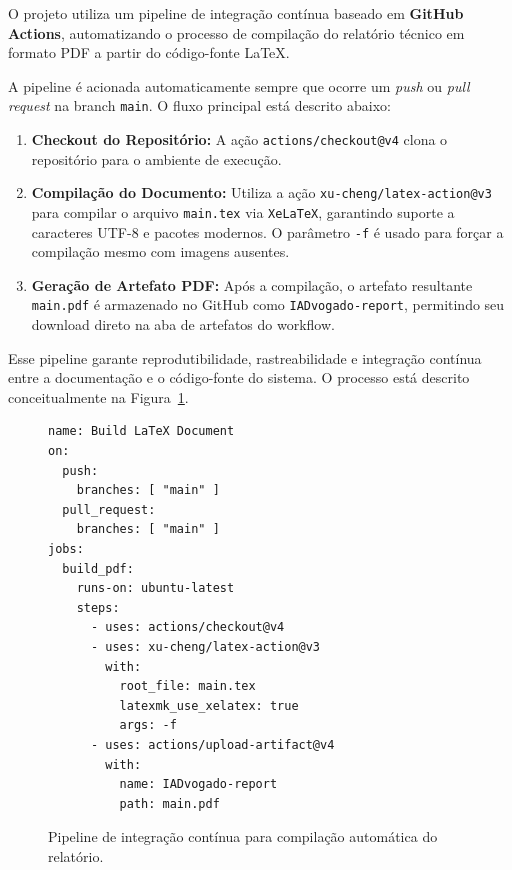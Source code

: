 \documentclass{article}
\begin{document}
O projeto utiliza um pipeline de integração contínua baseado em \textbf{GitHub Actions}, automatizando o processo de compilação do relatório técnico em formato PDF a partir do código-fonte \LaTeX.

A pipeline é acionada automaticamente sempre que ocorre um \textit{push} ou \textit{pull request} na branch \texttt{main}. O fluxo principal está descrito abaixo:

\begin{enumerate}
  \item \textbf{Checkout do Repositório:} A ação \texttt{actions/checkout@v4} clona o repositório para o ambiente de execução.
  \item \textbf{Compilação do Documento:} Utiliza a ação \texttt{xu-cheng/latex-action@v3} para compilar o arquivo \texttt{main.tex} via \texttt{XeLaTeX}, garantindo suporte a caracteres UTF-8 e pacotes modernos. O parâmetro \texttt{-f} é usado para forçar a compilação mesmo com imagens ausentes.
  \item \textbf{Geração de Artefato PDF:} Após a compilação, o artefato resultante \texttt{main.pdf} é armazenado no GitHub como \texttt{IADvogado-report}, permitindo seu download direto na aba de artefatos do workflow.
\end{enumerate}

Esse pipeline garante reprodutibilidade, rastreabilidade e integração contínua entre a documentação e o código-fonte do sistema. O processo está descrito conceitualmente na Figura~\ref{fig:pipeline-ci}.

\begin{figure}[H]
\centering
\begin{verbatim}
name: Build LaTeX Document
on:
  push:
    branches: [ "main" ]
  pull_request:
    branches: [ "main" ]
jobs:
  build_pdf:
    runs-on: ubuntu-latest
    steps:
      - uses: actions/checkout@v4
      - uses: xu-cheng/latex-action@v3
        with:
          root_file: main.tex
          latexmk_use_xelatex: true
          args: -f
      - uses: actions/upload-artifact@v4
        with:
          name: IADvogado-report
          path: main.pdf
\end{verbatim}
\caption{Pipeline de integração contínua para compilação automática do relatório.}
\label{fig:pipeline-ci}
\end{figure}


\newpage
\end{document}

